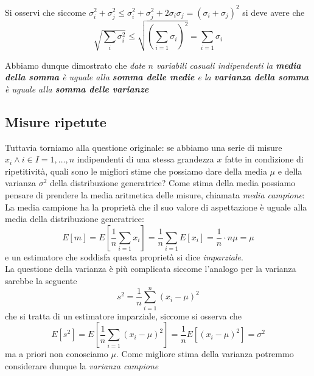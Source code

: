 \documentclass{report}
\begin{document}
\begin{myproof}
	Si osservi che siccome $\sigma_i^2 + \sigma_j^2 \leq \sigma_i^2 + \sigma_j^2 + 2\sigma_i \sigma_j = (\sigma_i + \sigma_j)^2$ si deve avere che
	$$
		\sqrt{\sum_{i} \sigma_i^2} \leq \sqrt{ \left( \sum_{i=1} \sigma_i \right)^2} = \sum_{i=1} \sigma_i
	$$
\end{myproof}
\noindent Abbiamo dunque dimostrato che \emph{date $n$ variabili casuali indipendenti la \textbf{media della somma} è uguale alla \textbf{somma delle medie} e la \textbf{varianza della somma} è uguale alla \textbf{somma delle varianze}}
\subsection{Misure ripetute}
Tuttavia torniamo alla questione originale: se abbiamo una serie di misure $x_i \wedge i \in I={1, \ldots, n}$ indipendenti di una stessa grandezza $x$ fatte in condizione di ripetitività, quali sono le migliori stime che possiamo dare della media $\mu$ e della varianza $\sigma^2$ della distribuzione generatrice? Come stima della media possiamo pensare di prendere la media aritmetica delle misure, chiamata \emph{media campione}:
\noindent La media campione ha la proprietà che il suo valore di aspettazione è uguale alla media della distribuzione generatrice:
\begin{equation*}
	E[m] = E \left[ \frac{1}{n} \sum_{i = 1} x_i \right] = \frac{1}{n} \sum_{i = 1} E[x_i] = \frac{1}{n} \cdot n\mu = \mu
\end{equation*}
e un estimatore che soddisfa questa proprietà si dice \emph{imparziale}. \\
La questione della varianza è più complicata siccome l'analogo per la varianza sarebbe la seguente
\begin{equation}
	s^2 = \frac{1}{n} \sum_{i = 1}^n (x_i - \mu)^2
\end{equation}
che si tratta di un estimatore imparziale, siccome si osserva che
$$
	E[s^2] = E \left[ \frac{1}{n} \sum_{i = 1} (x_i - \mu)^2 \right] = \frac{1}{n} E \left[(x_i - \mu)^2 \right] = \sigma^2
$$
ma a priori non conosciamo $\mu$. Come migliore stima della varianza potremmo considerare dunque la \emph{varianza campione}
\end{document}
